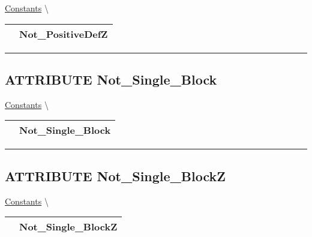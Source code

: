 \hypertarget{ecldoc:pbblas.constants.not_positivedefz}{}
\hspace{0pt} \hyperlink{ecldoc:PBblas.Constants}{Constants} \textbackslash 

{\renewcommand{\arraystretch}{1.5}
\begin{tabularx}{\textwidth}{|>{\raggedright\arraybackslash}l|X|}
\hline
\hspace{0pt}\mytexttt{\color{red} } & \textbf{Not\_PositiveDefZ} \\
\hline
\end{tabularx}
}

\par


\rule{\linewidth}{0.5pt}
\subsection*{\textsf{\colorbox{headtoc}{\color{white} ATTRIBUTE}
Not\_Single\_Block}}

\hypertarget{ecldoc:pbblas.constants.not_single_block}{}
\hspace{0pt} \hyperlink{ecldoc:PBblas.Constants}{Constants} \textbackslash 

{\renewcommand{\arraystretch}{1.5}
\begin{tabularx}{\textwidth}{|>{\raggedright\arraybackslash}l|X|}
\hline
\hspace{0pt}\mytexttt{\color{red} } & \textbf{Not\_Single\_Block} \\
\hline
\end{tabularx}
}

\par


\rule{\linewidth}{0.5pt}
\subsection*{\textsf{\colorbox{headtoc}{\color{white} ATTRIBUTE}
Not\_Single\_BlockZ}}

\hypertarget{ecldoc:pbblas.constants.not_single_blockz}{}
\hspace{0pt} \hyperlink{ecldoc:PBblas.Constants}{Constants} \textbackslash 

{\renewcommand{\arraystretch}{1.5}
\begin{tabularx}{\textwidth}{|>{\raggedright\arraybackslash}l|X|}
\hline
\hspace{0pt}\mytexttt{\color{red} } & \textbf{Not\_Single\_BlockZ} \\
\hline
\end{tabularx}
}

